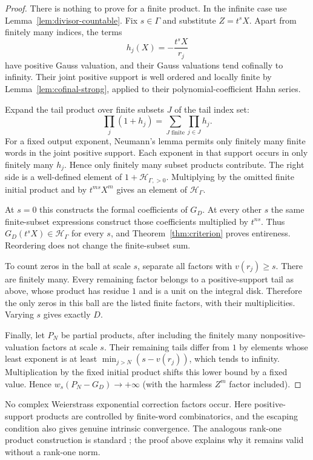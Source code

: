 \documentclass[11pt,letterpaper]{article}
\numberwithin{equation}{section}
\theoremstyle{definition}
\theoremstyle{remark}
\begin{document}
\begin{proof}
There is nothing to prove for a finite product. In the infinite case use
Lemma~\ref{lem:divisor-countable}. Fix $s\in\Gamma$ and substitute $Z=t^sX$.
Apart from finitely many indices, the terms
\[
 h_j(X)=-\frac{t^sX}{r_j}
\]
have positive Gauss valuation, and their Gauss valuations tend cofinally to
infinity. Their joint positive support is well ordered and locally finite
by Lemma~\ref{lem:cofinal-strong}, applied to their polynomial-coefficient
Hahn series.

Expand the tail product over finite subsets $J$ of the tail index set:
\begin{equation}\label{eq:subset-product}
 \prod_j(1+h_j)=\sum_{J\text{ finite}}\prod_{j\in J}h_j.
\end{equation}
For a fixed output exponent, Neumann's lemma permits only finitely many
finite words in the joint positive support. Each exponent in that support
occurs in only finitely many $h_j$. Hence only finitely many subset products
contribute. The right side is a well-defined element of
$1+\mathcal H_{\Gamma,>0}$. Multiplying by the omitted finite initial product
and by $t^{ms}X^m$ gives an element of $\mathcal H_\Gamma$.

At $s=0$ this constructs the formal coefficients of $G_D$. At every other
$s$ the same finite-subset expressions construct those coefficients multiplied
by $t^{ns}$. Thus $G_D(t^sX)\in\mathcal H_\Gamma$ for every $s$, and
Theorem~\ref{thm:criterion} proves entireness. Reordering does not change the
finite-subset sum.

To count zeros in the ball at scale $s$, separate all factors with
$v(r_j)\ge s$. There are finitely many. Every remaining factor belongs to
a positive-support tail as above, whose product has residue $1$ and is a
unit on the integral disk. Therefore the only zeros in this ball are the
listed finite factors, with their multiplicities. Varying $s$ gives exactly
$D$.

Finally, let $P_N$ be partial products, after including the finitely many
nonpositive-valuation factors at scale $s$. Their remaining tails differ
from $1$ by elements whose least exponent is at least
$\min_{j>N}(s-v(r_j))$, which tends to infinity. Multiplication by the fixed
initial product shifts this lower bound by a fixed value. Hence
$w_s(P_N-G_D)\to+\infty$ (with the harmless $Z^m$ factor included).
\end{proof}

No complex Weierstrass exponential correction factors occur. Here
positive-support products are controlled by finite-word combinatorics, and
the escaping condition also gives genuine intrinsic convergence. The analogous
rank-one product construction is standard \cite{CherryLectures,CherryFactorization};
the proof above explains why it remains valid without a rank-one norm.
\end{document}
